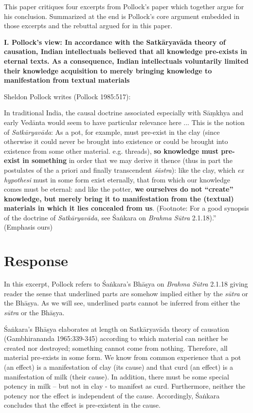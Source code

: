 This paper critiques four excerpts from Pollock's paper which together argue for his conclusion. Summarized at the end is Pollock's core argument embedded in those excerpts and the rebuttal argued for in this paper.

{\bf I. Pollock's view:  In accordance with the Satkāryavāda theory of causation, Indian intellectuals believed that all knowledge pre-exists in eternal texts. As a consequence, Indian intellectuals voluntarily limited their knowledge acquisition to merely bringing knowledge to manifestation from textual materials}

Sheldon Pollock writes (Pollock 1985:517):
\begin{myquote}
In traditional India, the causal doctrine associated especially with Sāṃkhya and early Vedānta  would seem to have particular relevance here ... This is the notion of {\sl Satkāryavāda}: As a pot, for example, must pre-exist in the clay (since otherwise it could never be brought into existence or could be brought into existence from some other material. e.g.  threads), \textbf{so knowledge must pre-exist in something} in order that we may derive it thence (thus in part the postulates of the a priori and finally transcendent {\sl śāstra}): like the clay, which {\sl ex hypothesi} must in some form exist eternally, that from which our knowledge comes must be eternal: and like the potter, \textbf{we ourselves do not ``create'' knowledge, but merely bring it to manifestation from the (textual) materials in which it lies concealed from us}. (Footnote: For a good synopsis of the doctrine of {\sl Satkāryavāda}, see Śaṅkara on {\sl Brahma Sūtra} 2.1.18).'' (Emphasis ours) 
\end{myquote}

\vskip -10pt

\section*{Response}

In this excerpt, Pollock refers to Śaṅkara's Bhāṣya on {\sl Brahma Sūtra} 2.1.18 giving reader the sense that underlined parts are somehow implied either by the {\sl sūtra} or the Bhāṣya.  As we will see, underlined parts cannot be inferred from either the {\sl sūtra} or the Bhāṣya.

Śaṅkara's Bhāṣya elaborates at length on Satkāryavāda theory of causation (Gambhirananda 1965:339-345) according to which material can neither be created nor destroyed; something cannot come from nothing. Therefore, all material pre-exists in some form.  We know from common experience that a pot (an effect) is a manifestation of clay (its cause) and that curd (an effect) is a manifestation of milk (their cause). In addition, there must be some special potency in milk -- but not in clay - to manifest as curd.  Furthermore, neither the potency nor the effect is independent of the cause.  Accordingly, Śaṅkara concludes that the effect is pre-existent in the cause.

